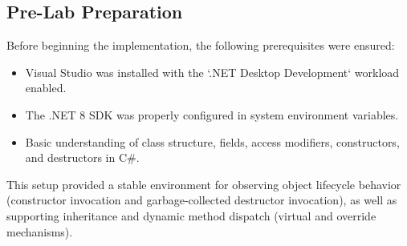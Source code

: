 \subsection*{Pre-Lab Preparation}
Before beginning the implementation, the following prerequisites were ensured:
\begin{itemize}
    \item Visual Studio was installed with the `.NET Desktop Development` workload enabled.
    \item The .NET 8 SDK was properly configured in system environment variables.
    \item Basic understanding of class structure, fields, access modifiers, constructors, and destructors in C\#.
\end{itemize}

This setup provided a stable environment for observing object lifecycle behavior (constructor invocation and garbage-collected destructor invocation), as well as supporting inheritance and dynamic method dispatch (virtual and override mechanisms).





